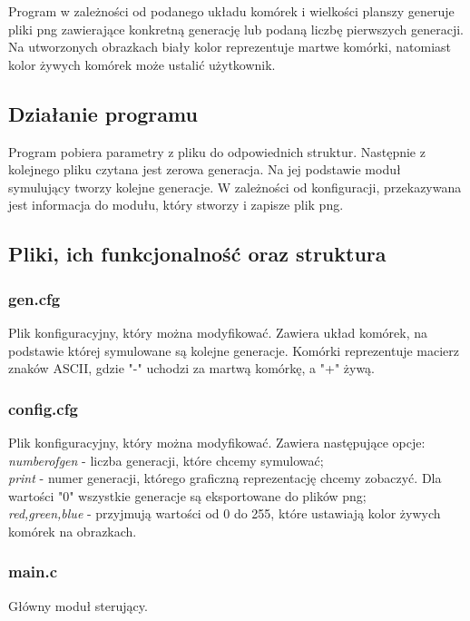 \documentclass{article}
\begin{document}
Program w zależności od podanego układu komórek i wielkości planszy generuje pliki png zawierające konkretną generację lub podaną liczbę pierwszych generacji. Na utworzonych obrazkach biały kolor reprezentuje martwe komórki, natomiast kolor żywych komórek może ustalić użytkownik.
\subsection*{Działanie programu}
Program pobiera parametry z pliku do odpowiednich struktur. Następnie z kolejnego pliku czytana jest zerowa generacja. Na jej podstawie moduł symulujący tworzy kolejne generacje. W
zależności od konfiguracji, przekazywana jest informacja do modułu, który stworzy i zapisze plik
png.
\subsection*{Pliki, ich funkcjonalność oraz struktura}
\subsubsection*{gen.cfg}
Plik konfiguracyjny, który można modyfikować. Zawiera układ komórek, na podstawie której symulowane są kolejne generacje. Komórki reprezentuje macierz znaków ASCII, gdzie "-" uchodzi za martwą komórkę, a "+" żywą.
\subsubsection*{config.cfg}
Plik konfiguracyjny, który można modyfikować. Zawiera następujące opcje:\\
\emph{numberofgen }- liczba generacji, które chcemy symulować;\\
\emph{print} - numer generacji, którego graficzną reprezentację chcemy zobaczyć. Dla wartości "0" wszystkie generacje są eksportowane do plików png;\\
\emph{red,green,blue} - przyjmują wartości  od 0 do 255, które ustawiają kolor żywych komórek na obrazkach.
\subsubsection*{main.c}
Główny moduł sterujący. 
\end{document}
